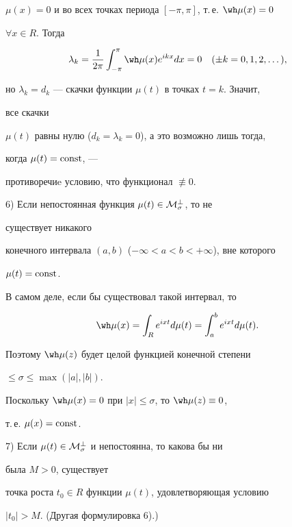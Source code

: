 $\mu(x)=0$ и во всех точках периода $[-\pi,\pi]$, т.\,е. $\wh\mu(x)=0$ 


$\forall x\in R$. Тогда 


$$ 


\lambda_k=\frac{1}{2\pi}\int^\pi_{-\pi} 


\wh\mu(x)e^{ikx}dx=0\quad (\pm k=0,1,2,\dotsc),


$$ 


но $\lambda_k{=}d_k$ --- скачки функции $\mu(t)$ в точках $t=k$. Значит, 


все скачки 


$\mu(t)$ равны нулю ($d_k{=}\lambda_k{=}0$), а это возможно лишь тогда, 


когда $\mu(t)=\operatorname{const}$, ---


противоречиe условию, что функционал $\not\equiv0$. 


 


6) Если непостоянная функция $\mu(t)\in\cal M^\bot_\sigma$, то не 


существует никакого 


конечного интервала $(a,b)$ ($-\infty<a<b<+\infty$), вне которого 


$\mu(t)=\operatorname{const}$. 


 


В самом деле, если бы существовал такой интервал, то 


$$ 


\wh\mu(x)=\int_R e^{ixt}d\mu(t)=\int^b_a e^{ixt}d\mu(t). 


$$ 


 


Поэтому $\wh\mu(z)$ будет целой функцией конечной степени 


$\le\sigma\le\max(|a|,|b|)$. 


Поскольку $\wh\mu(x)=0$ при $|x|\le\sigma$, то $\wh\mu(z)\equiv0$, 


т.\,е. $\mu(x)=\operatorname{const}$. 


 


7) Если $\mu(t)\in\cal M^\bot_\sigma$ и непостоянна, то какова бы ни 


была $M>0$, существует 


точка роста $t_0\in R$ функции $\mu(t)$, удовлетворяющая условию 


$|t_0|>M$. (Другая формулировка 6).) 


